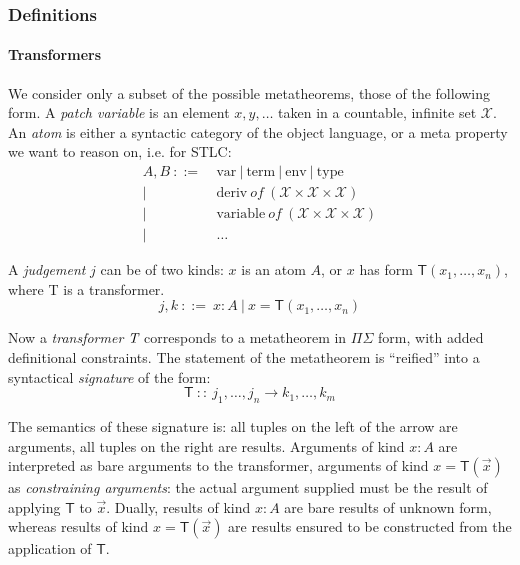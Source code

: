 \documentclass[twoside,a4paper,12pt]{article}
\begin{document}
\subsubsection{Definitions}

\paragraph{Transformers}

We consider only a subset of the possible metatheorems, those of the
following form. A \emph{patch variable} is an element $x,y,\ldots$
taken in a countable, infinite set $\mathcal X$. An \emph{atom} is
either a syntactic category of the object language, or a meta property
we want to reason on, i.e. for STLC:
\begin{align*}
  A,B\ ::=\ &\mathrm{var}\ |\ \mathrm{term}\ |\ \mathrm{env}\ |\
  \mathrm{type}\\
  |\ &{}\mathrm{deriv}\ {of}\ (\mathcal X \times \mathcal
  X\times\mathcal X)\\
  |\ &{}\mathrm{variable}\ of\ (\mathcal X\times
  \mathcal X\times\mathcal X) \\
  |\ &{}\ldots
\end{align*}

A \emph{judgement} $j$ can be of two kinds: $x$ is an atom $A$, or $x$
has form $\mathsf{T}(x_1,\ldots,x_n)$, where \textsf{T} is a transformer.
\[ j,k\ ::=\ x:A\ |\ x=\mathsf{T}(x_1,\ldots,x_n)\]

Now a \emph{transformer} $\emph{T}$ corresponds to a metatheorem in
$\Pi\Sigma$ form, with added definitional constraints. The statement
of the metatheorem is ``reified'' into a syntactical \emph{signature}
of the form:
\[ \mathsf{T}\ ::\ j_1, \ldots, j_n \longrightarrow k_1,\ldots, k_m \]

The semantics of these signature is: all tuples on the left of the
arrow are arguments, all tuples on the right are results. Arguments of
kind $x:A$ are interpreted as bare arguments to the transformer,
arguments of kind $x=\mathsf{T}(\vec x)$ as \emph{constraining
  arguments}: the actual argument supplied must be the result of
applying $\mathsf{T}$ to $\vec x$. Dually, results of kind $x:A$ are
bare results of unknown form, whereas results of kind
$x=\mathsf{T}(\vec x)$ are results ensured to be constructed from the
application of $\mathsf{T}$.
\end{document}
